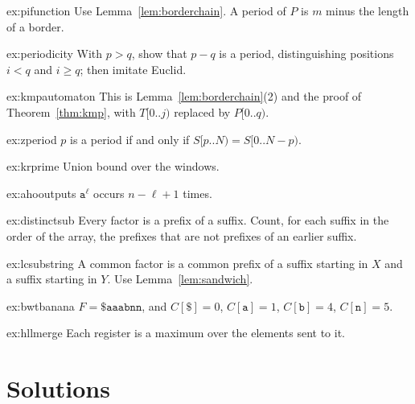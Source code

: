 \begin{hint}{ex:pifunction}
Use Lemma~\ref{lem:borderchain}. A period of $P$ is $m$ minus the length of a border.
\end{hint}
\begin{hint}{ex:periodicity}
With $p>q$, show that $p-q$ is a period, distinguishing positions $i<q$ and $i\ge q$; then imitate Euclid.
\end{hint}
\begin{hint}{ex:kmpautomaton}
This is Lemma~\ref{lem:borderchain}(2) and the proof of Theorem~\ref{thm:kmp}, with $T[0..j)$ replaced by $P[0..q)$.
\end{hint}
\begin{hint}{ex:zperiod}
$p$ is a period if and only if $S[p..N)=S[0..N-p)$.
\end{hint}
\begin{hint}{ex:krprime}
Union bound over the windows.
\end{hint}
\begin{hint}{ex:ahooutputs}
$\texttt{a}^\ell$ occurs $n-\ell+1$ times.
\end{hint}
\begin{hint}{ex:distinctsub}
Every factor is a prefix of a suffix. Count, for each suffix in the order of the array, the prefixes that are not prefixes of an earlier suffix.
\end{hint}
\begin{hint}{ex:lcsubstring}
A common factor is a common prefix of a suffix starting in $X$ and a suffix starting in $Y$. Use Lemma~\ref{lem:sandwich}.
\end{hint}
\begin{hint}{ex:bwtbanana}
$F=\texttt{\$aaabnn}$, and $C[\$]=0$, $C[\texttt a]=1$, $C[\texttt b]=4$, $C[\texttt n]=5$.
\end{hint}
\begin{hint}{ex:hllmerge}
Each register is a maximum over the elements sent to it.
\end{hint}

\section{Solutions}

